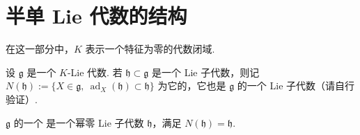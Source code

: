 \section{半单 Lie 代数的结构}\label{sec:lie-2-5}

在这一部分中，$K$ 表示一个特征为零的代数闭域.

\begin{numpara}\label{np:lie-2-5-1}
设 $\mathfrak g$ 是一个 $K$-Lie 代数. 若 $\mathfrak h\subset\mathfrak g$ 是一个 Lie 子代数，则记
$N(\mathfrak h):=\{X\in\mathfrak g,\ \operatorname{ad}_{X}(\mathfrak h)\subset\mathfrak h\}$
为它的，它也是 $\mathfrak g$ 的一个 Lie 子代数（请自行验证）.
\end{numpara}

\begin{definition*}
$\mathfrak g$ 的一个  是一个幂零 Lie 子代数 $\mathfrak h$，满足 $N(\mathfrak h)=\mathfrak h$.
\end{definition*}

